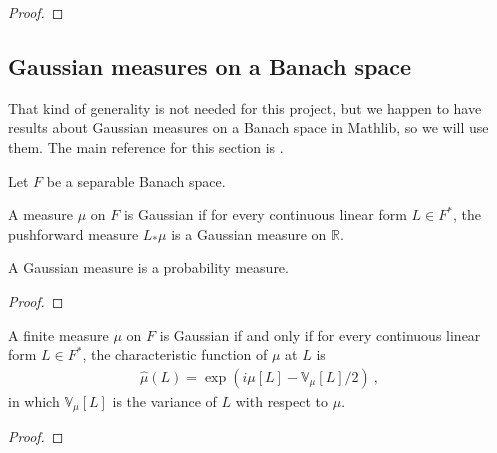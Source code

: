 \begin{proof}

\end{proof}


\subsection{Gaussian measures on a Banach space}

That kind of generality is not needed for this project, but we happen to have results about Gaussian measures on a Banach space in Mathlib, so we will use them.
The main reference for this section is \cite{hairer2009introduction}.

Let $F$ be a separable Banach space.

\begin{definition}\label{def:IsGaussian}
  \mathlibok
A measure $\mu$ on $F$ is Gaussian if for every continuous linear form $L \in F^*$, the pushforward measure $L_* \mu$ is a Gaussian measure on $\mathbb{R}$.
\end{definition}


\begin{lemma}\label{lem:IsGaussian.IsProbabilityMeasure}
  \mathlibok
A Gaussian measure is a probability measure.
\end{lemma}

\begin{proof}\leanok

\end{proof}


\begin{theorem}\label{thm:isGaussian_iff_charFunDual_eq}
  \mathlibok
A finite measure $\mu$ on $F$ is Gaussian if and only if for every continuous linear form $L \in F^*$, the characteristic function of $\mu$ at $L$ is
\begin{align*}
  \hat{\mu}(L) = \exp\left(i \mu[L] - \mathbb{V}_\mu[L] / 2\right) \: ,
\end{align*}
in which $\mathbb{V}_\mu[L]$ is the variance of $L$ with respect to $\mu$.
\end{theorem}

\begin{proof}\leanok

\end{proof}



